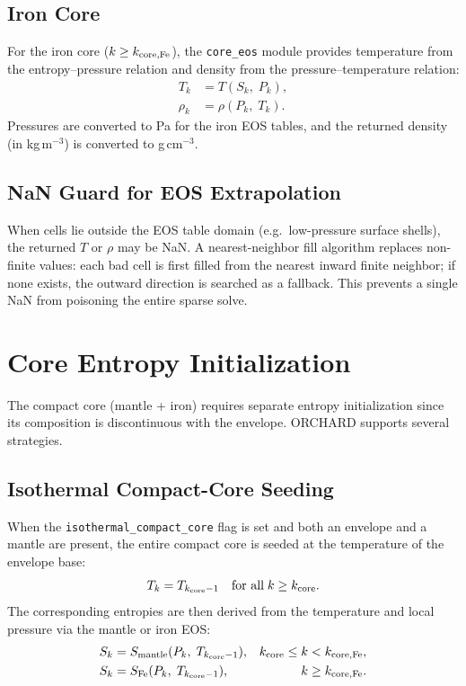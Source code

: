 \documentclass{aastex631}
\begin{document}
\subsection{Iron Core}

For the iron core ($k \ge k_{\rm core,Fe}$), the \texttt{core\_eos}
module provides temperature from the entropy--pressure relation and
density from the pressure--temperature relation:
\begin{align}
  T_k &= T(S_k,\;P_k), \label{eq:eos_fe_T}\\
  \rho_k &= \rho(P_k,\;T_k). \label{eq:eos_fe_rho}
\end{align}
Pressures are converted to Pa for the iron EOS tables, and the
returned density (in kg\,m$^{-3}$) is converted to g\,cm$^{-3}$.

\subsection{NaN Guard for EOS Extrapolation}\label{sec:nan_guard}

When cells lie outside the EOS table domain (e.g.\ low-pressure
surface shells), the returned $T$ or $\rho$ may be NaN.  A
nearest-neighbor fill algorithm replaces non-finite values:
each bad cell is first filled from the nearest inward finite
neighbor; if none exists, the outward direction is searched as a
fallback.  This prevents a single NaN from poisoning the entire
sparse solve.

\section{Core Entropy Initialization}\label{sec:core_init}

The compact core (mantle + iron) requires separate entropy
initialization since its composition is discontinuous with the
envelope.  ORCHARD supports several strategies.

\subsection{Isothermal Compact-Core Seeding}

When the \texttt{isothermal\_compact\_core} flag is set and both an
envelope and a mantle are present, the entire compact core is seeded
at the temperature of the envelope base:
\begin{equation}\label{eq:iso_seed}
  T_k = T_{k_{\rm core}-1}
  \quad\text{for all}\; k \ge k_{\rm core}.
\end{equation}
The corresponding entropies are then derived from the temperature
and local pressure via the mantle or iron EOS:
\begin{align}
  S_k &= S_{\rm mantle}(P_k,\;T_{k_{\rm core}-1}),
  &k_{\rm core} \le k < k_{\rm core,Fe},
  \label{eq:iso_seed_mantle}\\
  S_k &= S_{\rm Fe}(P_k,\;T_{k_{\rm core}-1}),
  &k \ge k_{\rm core,Fe}.
  \label{eq:iso_seed_fe}
\end{align}
\end{document}
